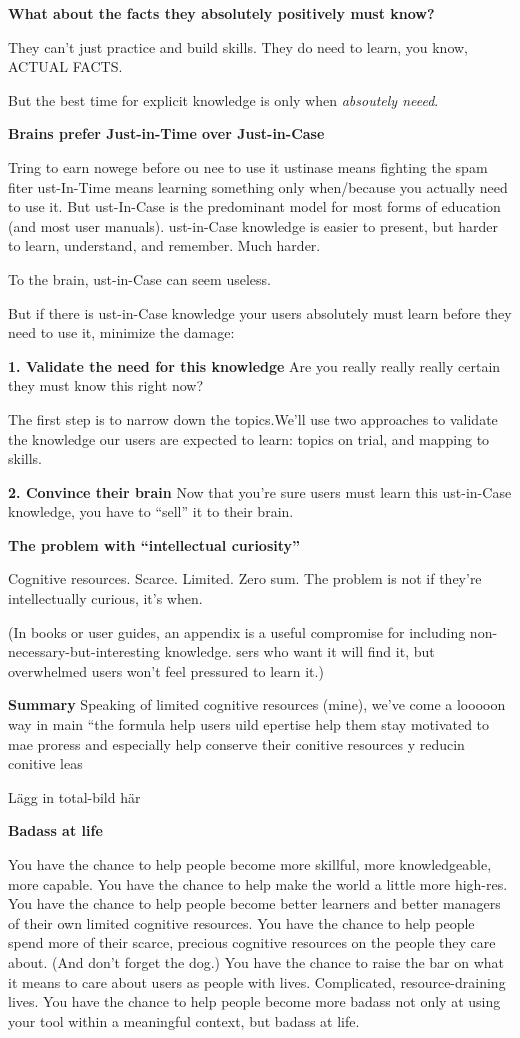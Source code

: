 \textbf{What about the facts they absolutely positively must know?}

They can’t just practice and build skills. They do need to learn, you know, ACTUAL FACTS.

But the best time for explicit knowledge is only when \textit{absoutely neeed}.

\textbf{Brains prefer Just-in-Time over Just-in-Case}

Tring to earn nowege before ou nee to use it
ustinase means fighting the spam fiter
ust-In-Time means learning something only when/because you actually need to use it. But ust-In-Case is the predominant model for most forms of education (and most user manuals). ust-in-Case knowledge is easier to present, but harder to learn, understand, and remember. Much harder.

To the brain, ust-in-Case can seem useless.

But if there is ust-in-Case knowledge your users absolutely must learn before they need to use it, minimize the damage:

\textbf{1. Validate the need for this knowledge}
Are you really really really certain they must know this right now?

The first step is to narrow down the topics.We’ll use two approaches to validate the knowledge our users are expected to learn: topics on trial, and mapping to skills.

\textbf{2. Convince their brain}
Now that you’re sure users must learn this ust-in-Case knowledge, you have to “sell” it to their brain.

\textbf{The problem with “intellectual curiosity”}

Cognitive resources. Scarce. Limited. Zero sum. The problem is not if they’re intellectually curious, it’s when.

(In books or user guides, an appendix is a useful compromise for including non-necessary-but-interesting knowledge. sers who want it will find it, but overwhelmed users won’t feel pressured to learn it.)

\textbf{Summary}
Speaking of limited cognitive resources (mine), we’ve come a looooon way in main “the formula help users uild epertise help them stay motivated to mae proress and especially help conserve their conitive resources y reducin conitive leas

Lägg in total-bild här

\textbf{Badass at life}

You have the chance to help people become more skillful, more knowledgeable, more capable.
You have the chance to help make the world a little more high-res.
You have the chance to help people become better learners and better managers of their own limited cognitive resources.
You have the chance to help people spend more of their scarce, precious cognitive resources on the people they care about. (And don’t forget the dog.)
You have the chance to raise the bar on what it means to care about users as people with lives. Complicated, resource-draining lives.
You have the chance to help people become more badass not only at using your tool within a meaningful context, but badass at life.